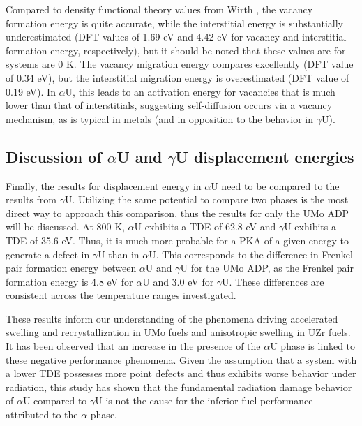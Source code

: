 \documentclass[review]{elsarticle}
\begin{document}
\FloatBarrier

Compared to density functional theory values from Wirth \cite{wirth2011}, the vacancy formation energy is quite accurate, while the interstitial energy is substantially underestimated (DFT values of 1.69 eV and 4.42 eV for vacancy and interstitial formation energy, respectively), but it should be noted that these values are for systems are 0 K. The vacancy migration energy compares excellently (DFT value of 0.34 eV), but the interstitial migration energy is overestimated (DFT value of 0.19 eV). In $\alpha$U, this leads to an activation energy for vacancies that is much lower than that of interstitials, suggesting self-diffusion occurs via a vacancy mechanism, as is typical in metals (and in opposition to the behavior in $\gamma$U). 

\subsection{Discussion of $\alpha$U and $\gamma$U displacement energies}

Finally, the results for displacement energy in $\alpha$U need to be compared to the results from $\gamma$U. Utilizing the same potential to compare two phases is the most direct way to approach this comparison, thus the results for only the UMo ADP will be discussed. At 800 K, $\alpha$U exhibits a TDE of 62.8 eV and $\gamma$U exhibits a TDE of 35.6 eV. Thus, it is much more probable for a PKA of a given energy to generate a defect in $\gamma$U than in $\alpha$U. This corresponds to the difference in Frenkel pair formation energy between $\alpha$U and $\gamma$U for the UMo ADP, as the Frenkel pair formation energy is 4.8 eV for $\alpha$U and 3.0 eV for $\gamma$U. These differences are consistent across the temperature ranges investigated.

These results inform our understanding of the phenomena driving accelerated swelling and recrystallization in UMo fuels and anisotropic swelling in UZr fuels. It has been observed that an increase in the presence of the $\alpha$U phase is linked to these negative performance phenomena. Given the assumption that a system with a lower TDE possesses more point defects and thus exhibits worse behavior under radiation, this study has shown that the fundamental radiation damage behavior of $\alpha$U compared to $\gamma$U is not the cause for the inferior fuel performance attributed to the $\alpha$ phase.

\FloatBarrier
\end{document}
